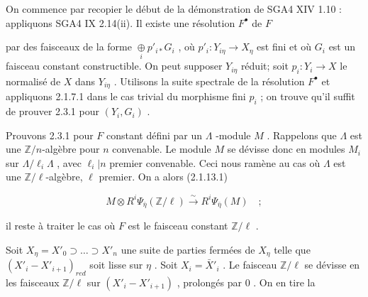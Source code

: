 On commence par recopier le début de la démonstration de SGA4 XIV 1.10 : appliquons SGA4 IX 2.14(ii). Il existe une résolution $F^{\bullet}$ de $F$

\begin{center}
\end{center}
par des faisceaux de la forme $\underset{i}{\oplus} p'_{i*} G_{i}$ , où $p'_{i} : Y_{i\eta} \to X_{\eta}$ est fini et où $G_{i}$ est un faisceau constant constructible. On peut supposer $Y_{i\eta}$ réduit; soit $p_{i} : Y_{i} \to X$ le normalisé de $X$ dans $Y_{i\eta}$ . Utilisons la suite spectrale de la résolution $F^{\bullet}$ et appliquons 2.1.7.1 dans le cas trivial du morphisme fini $p_{i}$ ; on trouve qu'il suffit de prouver 2.3.1 pour $(Y_{i}, G_{i})$ .

Prouvons 2.3.1 pour $F$ constant défini par un $\Lambda$ -module $M$ . Rappelons que $\Lambda$ est une $\mathbb{Z}/n$-algèbre pour $n$ convenable. Le module $M$ se dévisse donc en modules $M_{i}$ sur $\Lambda/\ell_{i}\Lambda$ , avec $\ell_{i}|n$ premier convenable. Ceci nous ramène au cas où $\Lambda$ est une $\mathbb{Z}/\ell$-algèbre, $\ell$ premier. On a alors (2.1.13.1)

\begin{equation*}
M \otimes R^{i}\Psi_{\bar{\eta}}(\mathbb{Z}/\ell) \overset{\sim}{\longrightarrow} R^{i}\Psi_{\bar{\eta}}(M) \quad ; 
\end{equation*}


 il reste à traiter le cas où $F$ est le faisceau constant $\mathbb{Z}/\ell$ .

Soit $X_{\eta} = X'_{0} \supset \ldots \supset X'_{n}$ une suite de parties fermées de $X_{\eta}$ telle que $(X'_{i} - X'_{i+1})_{red}$ soit lisse sur $\eta$ . Soit $X_{i} = \bar{X}'_{i}$ . Le faisceau $\mathbb{Z}/\ell$ se dévisse en les faisceaux $\mathbb{Z}/\ell$ sur $(X'_{i} - X'_{i+1})$ , prolongés par $0$ . On en tire la

